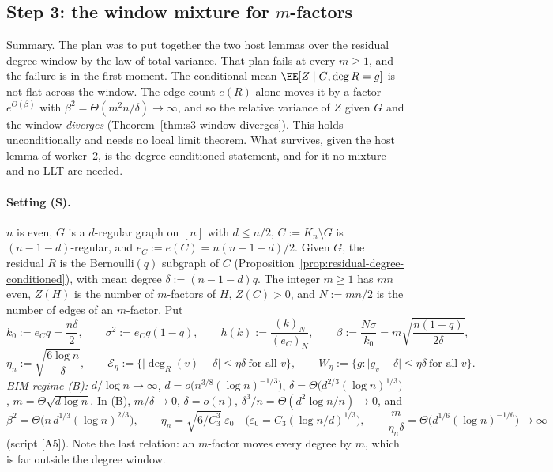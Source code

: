 
\subsection*{Step 3: the window mixture for \(m\)-factors}

Summary. The plan was to put together the two host lemmas over the residual
degree window by the law of total variance. That plan fails at every \(m\ge1\), and
the failure is in the first moment. The conditional mean
\(\EE[Z\mid G,\deg R=g]\) is not flat across the window. The edge count
\(e(R)\) alone moves it by a factor \(e^{\Theta(\beta)}\) with
\(\beta^2=\Theta(m^2n/\delta)\to\infty\), and so the relative variance of
\(Z\) given \(G\) and the window \emph{diverges}
(Theorem~\ref{thm:s3-window-diverges}). This holds unconditionally and needs no
local limit theorem. What survives, given the host lemma of worker~2, is the
degree-conditioned statement, and for it no mixture and no LLT are needed.

\paragraph{Setting (S).}
\(n\) is even, \(G\) is a \(d\)-regular graph on \([n]\) with \(d\le n/2\),
\(C:=K_n\setminus G\) is \((n-1-d)\)-regular, and \(e_C:=e(C)=n(n-1-d)/2\).
Given \(G\), the residual \(R\) is the Bernoulli\((q)\) subgraph of \(C\)
(Proposition~\ref{prop:residual-degree-conditioned}), with mean degree
\(\delta:=(n-1-d)q\). The integer \(m\ge1\) has \(mn\) even, \(Z(H)\) is the number of
\(m\)-factors of \(H\), \(Z(C)>0\), and \(N:=mn/2\) is the number of edges of an
\(m\)-factor. Put
\[
k_0:=e_Cq=\frac{n\delta}{2},\qquad
\sigma^2:=e_Cq(1-q),\qquad
h(k):=\frac{(k)_N}{(e_C)_N},\qquad
\beta:=\frac{N\sigma}{k_0}=m\sqrt{\frac{n(1-q)}{2\delta}},
\]
\[
\eta_n:=\sqrt{\frac{6\log n}{\delta}},\qquad
\mathcal E_\eta:=\bigl\{\lvert\deg_R(v)-\delta\rvert\le\eta\delta\ \text{for all }v\bigr\},\qquad
W_\eta:=\bigl\{g:\lvert g_v-\delta\rvert\le\eta\delta\ \text{for all }v\bigr\}.
\]
\emph{BIM regime (B):} \(d/\log n\to\infty\), \(d=o\bigl(n^{3/8}(\log n)^{-1/3}\bigr)\),
\(\delta=\Theta\bigl(d^{2/3}(\log n)^{1/3}\bigr)\), \(m=\Theta\sqrt{d\log n}\).
In (B), \(m/\delta\to0\), \(\delta=o(n)\), \(\delta^3/n=\Theta(d^2\log n/n)\to0\), and
\[
\beta^2=\Theta\bigl(n\,d^{1/3}(\log n)^{2/3}\bigr),\qquad
\eta_n=\sqrt{6/C_3^3}\;\varepsilon_0\quad\bigl(\varepsilon_0=C_3(\log n/d)^{1/3}\bigr),\qquad
\frac{m}{\eta_n\delta}=\Theta\bigl(d^{1/6}(\log n)^{-1/6}\bigr)\to\infty
\]
(script [A5]). Note the last relation: an \(m\)-factor moves every degree by
\(m\), which is far outside the degree window.


